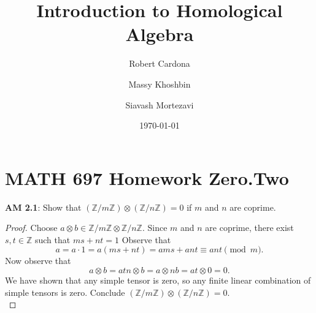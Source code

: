 \documentclass[8pt]{amsart}
\theoremstyle{plain}%
\theoremstyle{definition}
\theoremstyle{remark}
\numberwithin{equation}{section}
\newcommand{\Z}{\mathbb{Z}}
\begin{document}
\title[MATH 697]{Introduction to Homological Algebra}


\author{
	Robert Cardona %
	\and
	Massy Khoshbin %
	\and
	Siavash Mortezavi %
}


\address{Department of Mathematics \\ California State University Long Beach}

\date{\today}


\maketitle

\setcounter{section}{-1}
\section{MATH 697 Homework Zero.Two}


\textbf{ AM 2.1}: Show that $(\Z/m\Z) \otimes (\Z/n\Z) = 0$ if $m$ and $n$ are coprime.
	\begin{proof}
		Choose $a \otimes b \in \Z/m\Z \otimes \Z/n\Z$. Since $m$ and $n$ are coprime, there exist $s, t \in \Z$ such that $ms + nt = 1$ Observe that $$a = a \cdot 1 = a(ms + nt) = ams + ant \equiv ant \pmod m.$$ Now observe that $$a \otimes b = atn \otimes b = a \otimes nb = at \otimes 0 = 0.$$
		We have shown that any simple tensor is zero, so any finite linear combination of simple tensors is zero. Conclude $(\Z/m\Z) \otimes (\Z/n\Z) = 0$.\\
	\end{proof}
\end{document}
